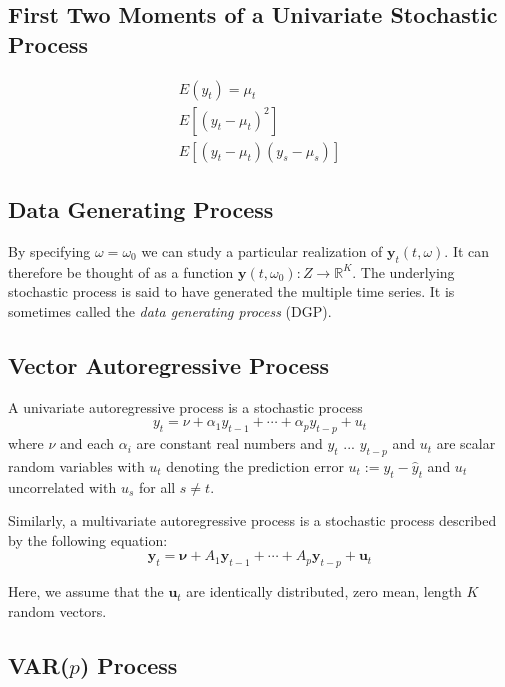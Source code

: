 \documentclass{article}
\begin{document}
        \subsection{First Two Moments of a Univariate Stochastic Process}

            \begin{align*}
                E(y_t) = \mu_t \\
                E[(y_t - \mu_t)^2] \\
                E[(y_t - \mu_t)(y_s - \mu_s)]
            \end{align*}

        \subsection{Data Generating Process}

            By specifying $\omega = \omega_0$ we can study a particular
            realization of $\bm{y}_t(t, \omega)$. It can therefore be 
            thought of as a function $\bm{y}(t, \omega_0): 
            Z \rightarrow \mathbb{R}^K$. The underlying stochastic process 
            is said to have generated the multiple time series. It is
            sometimes called the \textit{data generating process} (DGP).

        \subsection{Vector Autoregressive Process}

            A univariate autoregressive process is a stochastic process
            \[
                y_t = \nu + \alpha_1 y_{t-1} + \cdots + \alpha_p y_{t - p} + u_t
            \]
            where $\nu$ and each $\alpha_i$ are constant real numbers and $y_t$
            ... $y_{t-p}$ and $u_t$ are scalar random variables with $u_t$ denoting the
            prediction error $u_t := y_t - \hat{y}_t$ and $u_t$ uncorrelated 
            with $u_s$ for all $s \neq t$.

            Similarly, a multivariate autoregressive process is a stochastic process
            described by the following equation:
            \[
                \bm{y}_t = \bm{\nu} + A_1 \bm{y}_{t-1} + \cdots + A_p \bm{y}_{t-p} + \bm{u}_t
            \]

            Here, we assume that the $\bm{u}_t$ are identically distributed, zero mean,
            length $K$ random vectors.

        \subsection{VAR($p$) Process} \label{sec:VARp}
\end{document}
